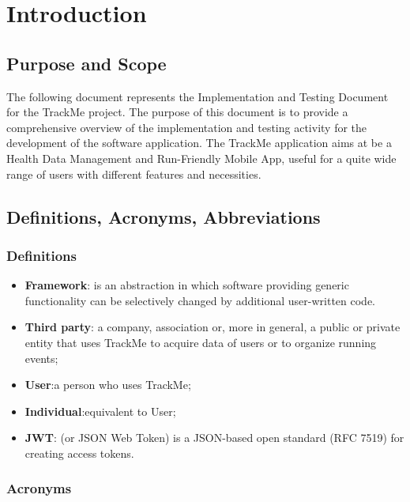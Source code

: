 \section{Introduction}
\subsection{Purpose and Scope}
	The following document represents the Implementation and Testing Document for
the TrackMe project.
The purpose of this document is to provide a comprehensive overview of the
implementation and testing activity for the development of the software application.
The TrackMe application aims at be a Health Data Management and Run-Friendly Mobile
App, useful for a quite wide range of users with different features and necessities.
\subsection{Definitions, Acronyms, Abbreviations}

\subsubsection{Definitions}
\begin{itemize}
	\item \textbf{Framework}: is an abstraction in which software providing generic functionality can be selectively changed by additional user-written code.
		
	\item \textbf{Third party}: a company, association or, more in general, a public or private entity that uses TrackMe to acquire data of users or to organize running events;
	
	\item \textbf{User}:a person who uses TrackMe;

	\item \textbf{Individual}:equivalent to User;
	
	\item \textbf{JWT}: (or JSON Web Token) is a JSON-based open standard (RFC 7519) for creating access tokens.

\end{itemize}

\subsubsection{Acronyms}

